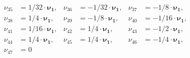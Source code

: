 \documentclass[a4paper,12pt, DIV=14, BCOR=5mm, twoside, headsepline, numbers=noenddot]{scrbook}
\begin{document}
\begin{align}
\begin{alignedat}{3}
%
\nu_{{35}} &= 1/32\cdot \boldsymbol{\nu_1} ,  & \nu_{{36}}   &= -1/32\cdot \boldsymbol{\nu_1} ,   & \nu_{{37}}    &= -1/8\cdot \boldsymbol{\nu_1} , \\
%
\nu_{{38}} &= 1/4\cdot \boldsymbol{\nu_1} ,  & \nu_{{39}}   &= -1/8\cdot \boldsymbol{\nu_1} ,   & \nu_{{40}}    &= -1/16\cdot \boldsymbol{\nu_1} , \\
%
\nu_{{41}} &= 1/16\cdot \boldsymbol{\nu_1} ,  & \nu_{{42}}   &= 1/4\cdot \boldsymbol{\nu_1} ,   & \nu_{{43}}    &= -1/2\cdot \boldsymbol{\nu_1} , \\
%
\nu_{{44}} &= 1/4\cdot \boldsymbol{\nu_1} ,  & \nu_{{45}}   &= 1/4\cdot \boldsymbol{\nu_1} ,   & \nu_{{46}}    &= -1/4\cdot \boldsymbol{\nu_1} , \\
%
\nu_{{47}} &= 0  &   &   &    & 
\end{alignedat}
\end{align}
\end{document}
